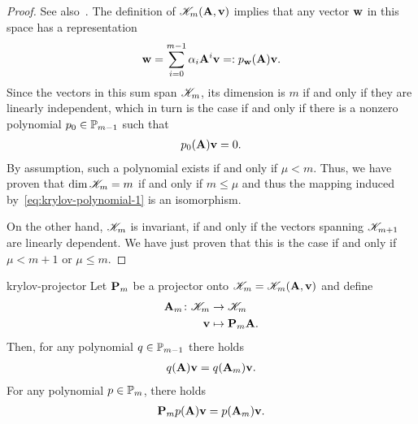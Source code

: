 \begin{proof}
  See also~\cite[Propositions 6.1 \& 6.2]{Saad00}.
  The definition of $\krylov_m(\mata,\vv)$ implies that any vector $\vw$ in this space has a representation
  \begin{gather}
    \vw = \sum_{i=0}^{m-1} \alpha_i \mata^i\vv =: p_{\vw}(\mata) \vv.
  \end{gather}
  Since the vectors in this sum span $\krylov_m$, its dimension is
  $m$ if and only if they are linearly independent, which in turn is
  the case if and only if there is a nonzero polynomial
  $p_0\in\P_{m-1}$ such that
  \begin{gather}
    p_0(\mata)\vv = 0.
  \end{gather}
  By assumption, such a polynomial exists if and only if
  $\mu<m$. Thus, we have proven that $\dim \krylov_m = m$ if and only
  if $m\le \mu$ and thus the mapping induced
  by~\eqref{eq:krylov-polynomial-1} is an isomorphism.

  On the other hand, $\krylov_m$ is invariant, if and only if the
  vectors spanning $\krylov_{m+1}$ are linearly dependent. We have
  just proven that this is the case if and only if $\mu<m+1$ or
  $\mu\le m$.
\end{proof}

\begin{Lemma}{krylov-projector}
  Let $\matp_m$ be a projector onto $\krylov_m=\krylov_m(\mata,\vv)$ and define
  \begin{align}
    \mata_m\colon \krylov_m &\to \krylov_m\\
    \vv&\mapsto \matp_m \mata.
  \end{align}
  Then, for any polynomial $q\in\P_{m-1}$ there holds
  \begin{gather}
    \label{eq:krylov-projector-1}
    q(\mata)\vv = q(\mata_m)\vv.
  \end{gather}
  For any polynomial $p\in\P_m$, there holds
  \begin{gather}
    \label{eq:krylov-projector-2}
    \matp_m p(\mata)\vv = p(\mata_m)\vv.
  \end{gather}
\end{Lemma}

